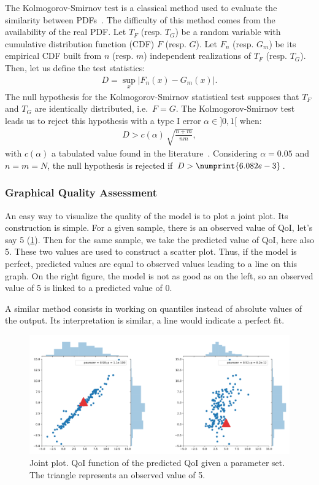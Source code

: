 The Kolmogorov-Smirnov test is a classical method used to evaluate the similarity between PDFs~\citep{clarke1992}. The difficulty of this method comes from the availability of the real PDF. Let $T_F$ (resp. $T_G$) be a random variable with cumulative distribution function (CDF) $F$ (resp. $G$). Let $F_n$ (resp. $G_m$) be its empirical CDF built from $n$ (resp. $m$) independent realizations of $T_F$ (resp. $T_G$). Then, let us define the test statistics:
\begin{align}
D = \sup_{x} \lvert F_n(x) - G_m(x)\rvert.
\end{align}
The null hypothesis for the Kolmogorov-Smirnov statistical test supposes that $T_F$ and $T_G$ are identically distributed, i.e.~$F=G$. The Kolmogorov-Smirnov test leads us to reject this hypothesis with a type I error $\alpha\in]0,1[$ when:
\begin{align}
D > c(\alpha)\,\sqrt{\frac{n+m}{nm}}, \label{eq:nullhypothesis}
\end{align}
with $c(\alpha)$ a tabulated value found in the literature~\citep{smirnov1939}. Considering $\alpha = 0.05$ and $n = m = N$, the null hypothesis is rejected if $D > \numprint{6.082e-3}$.

\subsubsection{Graphical Quality Assessment}
An easy way to visualize the quality of the model is to plot a joint plot. Its construction is simple. For a given sample, there is an observed value of QoI, let's say 5 (\cref{fig:qq_plot}). Then for the same sample, we take the predicted value of QoI, here also 5. These two values are used to construct a scatter plot. Thus, if the model is perfect, predicted values are equal to observed values leading to a line on this graph. On the right figure, the model is not as good as on the left, so an observed value of 5 is linked to a predicted value of 0.

A similar method consists in working on quantiles instead of absolute values of the output. Its interpretation is similar, a line would indicate a perfect fit.

\begin{figure}[!ht]
\centering
\includegraphics[width=\linewidth,keepaspectratio]{fig/literature/qq_plot.png}
\caption{Joint plot. QoI function of the predicted QoI given a parameter set. The triangle represents an observed value of 5.}
\label{fig:qq_plot}
\end{figure}

